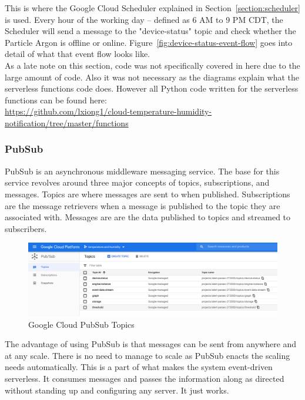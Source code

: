 \documentclass{article}
\begin{document}
This is where the Google Cloud Scheduler explained in Section~\ref{section:scheduler} is used. Every hour of the working day -- defined as 6 AM to 9 PM CDT, the Scheduler will send a message to the "device-status" topic and check whether the Particle Argon is offline or online. Figure~\ref{fig:device-status-event-flow} goes into detail of what that event flow looks like.\\

As a late note on this section, code was not specifically covered in here due to the large amount of code. Also it was not necessary as the diagrams explain what the serverless functions code does. However all Python code written for the serverless functions can be found here:\\

\url{https://github.com/lxiong1/cloud-temperature-humidity-notification/tree/master/functions}

\subsubsection{PubSub}
\label{section:pubsub}
PubSub is an asynchronous middleware messaging service. The base for this service revolves around three major concepts of topics, subscriptions, and messages. Topics are where messages are sent to when published. Subscriptions are the message retrievers when a message is published to the topic they are associated with. Messages are are the data published to topics and streamed to subscribers.

\begin{figure}[H]
	\center
	\includegraphics[width=\textwidth]{images/pubsub-topics.png}
	\caption{Google Cloud PubSub Topics}
	\label{fig:pubsub-topics}
\end{figure}

The advantage of using PubSub is that messages can be sent from anywhere and at any scale. There is no need to manage to scale as PubSub enacts the scaling needs automatically. This is a part of what makes the system event-driven serverless. It consumes messages and passes the information along as directed without standing up and configuring any server. It just works.\\
\end{document}
